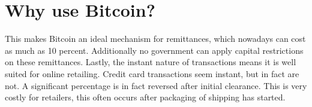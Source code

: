 
\chapter{Why use Bitcoin?}

This makes Bitcoin an ideal mechanism for remittances, which nowadays
can cost as much as 10 percent. Additionally no government can apply
capital restrictions on these remittances. Lastly, the instant nature
of transactions means it is well suited for online retailing. Credit
card transactions seem instant, but in fact are not. A significant
percentage is in fact reversed after initial clearance. This is very
costly for retailers, this often occurs after packaging of shipping
has started.
